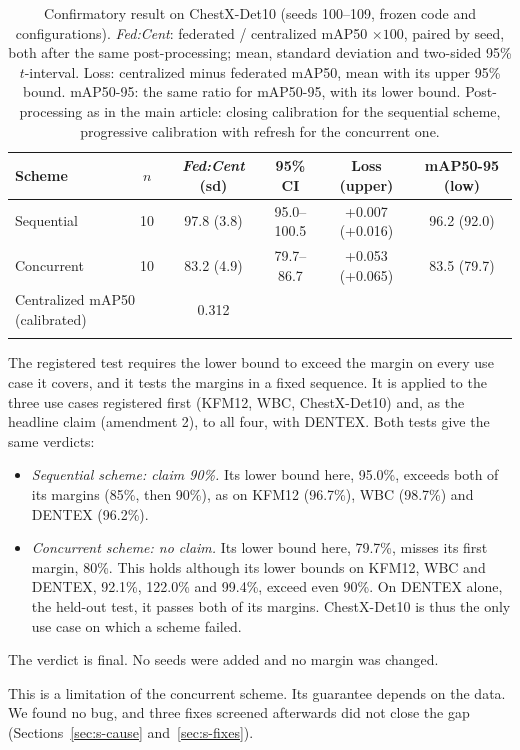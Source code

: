 \documentclass[pdflatex,sn-mathphys-num]{sn-jnl}
\newcommand{\fedcent}{\textit{Fed:Cent}}
\begin{document}
\begin{table}[h]
\caption{Confirmatory result on ChestX-Det10 (seeds 100--109, frozen code and configurations). \fedcent{}: federated / centralized mAP50 $\times100$, paired by seed, both after the same post-processing; mean, standard deviation and two-sided 95\% $t$-interval. Loss: centralized minus federated mAP50, mean with its upper 95\% bound. mAP50-95: the same ratio for mAP50-95, with its lower bound. Post-processing as in the main article: closing calibration for the sequential scheme, progressive calibration with refresh for the concurrent one.}\label{tab:s-confirm}
\footnotesize
\setlength{\tabcolsep}{3pt}
\begin{tabular*}{\textwidth}{@{\extracolsep\fill}lccccc}
\toprule
Scheme & $n$ & \fedcent{} (sd) & 95\% CI & Loss (upper) & mAP50-95 (low) \\
\midrule
Sequential & 10 & 97.8 (3.8) & 95.0--100.5 & +0.007 (+0.016) & 96.2 (92.0) \\
Concurrent & 10 & 83.2 (4.9) & 79.7--86.7 & +0.053 (+0.065) & 83.5 (79.7) \\
\midrule
\multicolumn{2}{l}{Centralized mAP50 (calibrated)} & 0.312 & & & \\
\botrule
\end{tabular*}
\end{table}

The registered test requires the lower bound to exceed the margin on every use case it covers, and it tests the margins in a fixed sequence. It is applied to the three use cases registered first (KFM12, WBC, ChestX-Det10) and, as the headline claim (amendment 2), to all four, with DENTEX. Both tests give the same verdicts:
\begin{itemize}
\item \emph{Sequential scheme: claim 90\%.} Its lower bound here, 95.0\%, exceeds both of its margins (85\%, then 90\%), as on KFM12 (96.7\%), WBC (98.7\%) and DENTEX (96.2\%).
\item \emph{Concurrent scheme: no claim.} Its lower bound here, 79.7\%, misses its first margin, 80\%. This holds although its lower bounds on KFM12, WBC and DENTEX, 92.1\%, 122.0\% and 99.4\%, exceed even 90\%. On DENTEX alone, the held-out test, it passes both of its margins. ChestX-Det10 is thus the only use case on which a scheme failed.
\end{itemize}
The verdict is final. No seeds were added and no margin was changed.

This is a limitation of the concurrent scheme. Its guarantee depends on the data. We found no bug, and three fixes screened afterwards did not close the gap (Sections~\ref{sec:s-cause} and~\ref{sec:s-fixes}).
\end{document}
